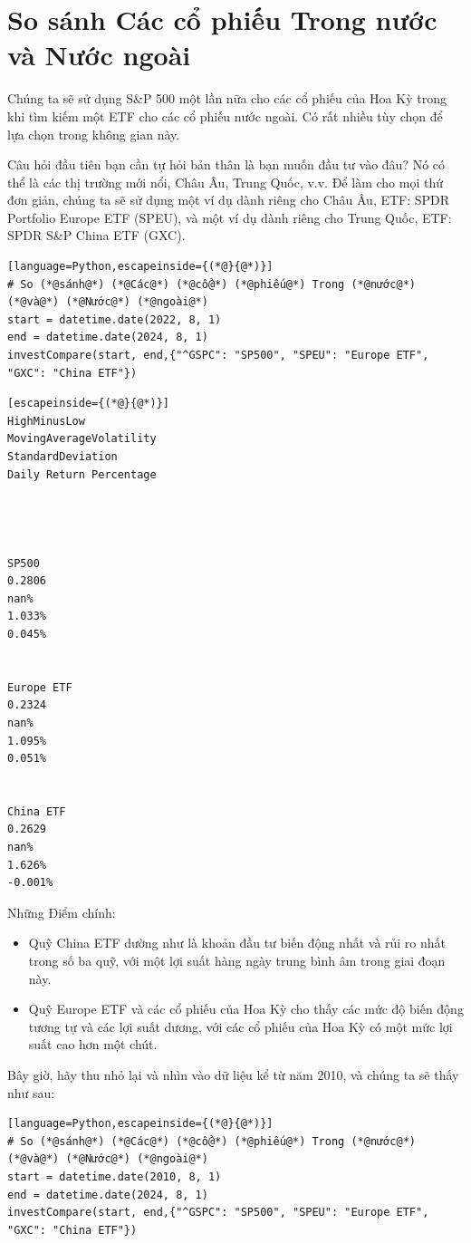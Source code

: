 \section{So sánh Các cổ phiếu Trong nước và Nước ngoài}

Chúng ta sẽ sử dụng S\&P 500 một lần nữa cho các cổ phiếu của Hoa Kỳ trong khi tìm kiếm một ETF cho các cổ phiếu nước ngoài. Có rất nhiều tùy chọn để lựa chọn trong không gian này.

Câu hỏi đầu tiên bạn cần tự hỏi bản thân là bạn muốn đầu tư vào đâu? Nó có thể là các thị trường mới nổi, Châu Âu, Trung Quốc, v.v. Để làm cho mọi thứ đơn giản, chúng ta sẽ sử dụng một ví dụ dành riêng cho Châu Âu, ETF: SPDR Portfolio Europe ETF (SPEU), và một ví dụ dành riêng cho Trung Quốc, ETF: SPDR S\&P China ETF (GXC).

\begin{lstlisting}[language=Python,escapeinside={(*@}{@*)}]
# So (*@sánh@*) (*@Các@*) (*@cổ@*) (*@phiếu@*) Trong (*@nước@*) (*@và@*) (*@Nước@*) (*@ngoài@*)
start = datetime.date(2022, 8, 1)
end = datetime.date(2024, 8, 1)
investCompare(start, end,{"^GSPC": "SP500", "SPEU": "Europe ETF", "GXC": "China ETF"})
\end{lstlisting}

\begin{lstlisting}[escapeinside={(*@}{@*)}]
HighMinusLow
MovingAverageVolatility
StandardDeviation
Daily Return Percentage




SP500
0.2806
nan%
1.033%
0.045%


Europe ETF
0.2324
nan%
1.095%
0.051%


China ETF
0.2629
nan%
1.626%
-0.001%
\end{lstlisting}

Những Điểm chính:

\begin{itemize}
  \item Quỹ China ETF dường như là khoản đầu tư biến động nhất và rủi ro nhất trong số ba quỹ, với một lợi suất hàng ngày trung bình âm trong giai đoạn này.
  \item Quỹ Europe ETF và các cổ phiếu của Hoa Kỳ cho thấy các mức độ biến động tương tự và các lợi suất dương, với các cổ phiếu của Hoa Kỳ có một mức lợi suất cao hơn một chút.
\end{itemize}
Bây giờ, hãy thu nhỏ lại và nhìn vào dữ liệu kể từ năm 2010, và chúng ta sẽ thấy như sau:

\begin{lstlisting}[language=Python,escapeinside={(*@}{@*)}]
# So (*@sánh@*) (*@Các@*) (*@cổ@*) (*@phiếu@*) Trong (*@nước@*) (*@và@*) (*@Nước@*) (*@ngoài@*)
start = datetime.date(2010, 8, 1)
end = datetime.date(2024, 8, 1)
investCompare(start, end,{"^GSPC": "SP500", "SPEU": "Europe ETF", "GXC": "China ETF"})
\end{lstlisting}

